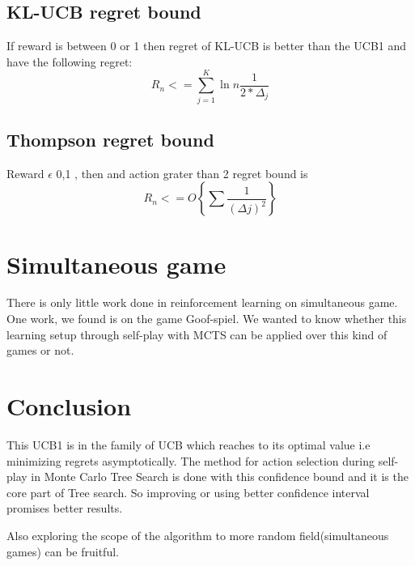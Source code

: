 \subsection{KL-UCB regret bound}
If reward is between 0 or 1 then regret of KL-UCB is better than the UCB1 and have the following regret:
$$
R_{n} <= \sum_{j=1}^{K} \ln{n}\dfrac{1}{2*\Delta_{j}} 
$$ \cite{klucbbound}

\subsection{Thompson regret bound}
Reward $\epsilon$ {0,1} , then and action grater than 2 regret bound is
$$
    R_{n} <=O \left \lbrace \sum \dfrac{1}{(\Delta{j})^2} \right \rbrace
$$

\cite{thompsonbound}

\section{Simultaneous game}
There is only little work done in reinforcement learning on simultaneous game. One work, we found is on the game Goof-spiel. We wanted to know whether this learning setup through self-play with MCTS can be applied over this kind of games or not.

\section{Conclusion}
This UCB1 is in the family of UCB which reaches to its optimal value i.e minimizing regrets asymptotically. The method for action selection during self-play in Monte Carlo Tree Search is done with this confidence bound and it is the core part of Tree search. So improving or using better confidence interval promises better results.


Also exploring the scope of the algorithm to more random field(simultaneous games) can be fruitful.

